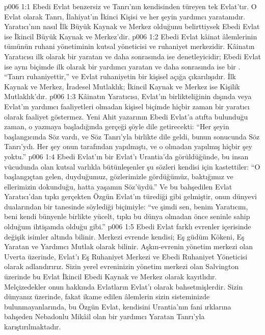 \vs p006 1:1 Ebedi Evlat benzersiz ve Tanrı’nın kendisinden türeyen tek Evlat’tır. O Evlat olarak Tanrı, İlahiyat’ın İkinci Kişisi ve her şeyin yardımcı yaratanıdır. Yaratıcı’nın nasıl İlk Büyük Kaynak ve Merkez olduğunu belirttiysek Ebedi Evlat ise İkincil Büyük Kaynak ve Merkez’dir.
\vs p006 1:2 Ebedi Evlat kâinat âlemlerinin tümünün ruhani yönetiminin kutsal yöneticisi ve ruhaniyet merkezidir. Kâinatın Yaratıcısı ilk olarak bir yaratan ve daha sonrasında ise denetleyicidir; Ebedi Evlat ise aynı biçimde ilk olarak bir yardımcı yaratan ve daha sonrasında ise bir . “Tanrı ruhaniyettir,” ve Evlat ruhaniyetin bir kişisel açığa çıkarılışıdır. İlk Kaynak ve Merkez, İradesel Mutlaklık; İkincil Kaynak ve Merkez ise Kişilik Mutlaklık’dır.
\vs p006 1:3 Kâinatın Yaratıcısı, Evlat’ın birlikteliğinin dışında veya Evlat’ın yardımcı faaliyetleri olmadan kişisel biçimde hiçbir zaman bir yaratıcı olarak faaliyet göstermez. Yeni Ahit yazarının Ebedi Evlat’a atıfta bulunduğu zaman, o yazmaya başladığında gerçeği şöyle dile getirecekti: “Her şeyin başlangıcında Söz vardı, ve Söz Tanrı’yla birlikte dile geldi, bunun sonucunda Söz Tanrı’ydı. Her şey onun tarafından yapılmıştı, ve o olmadan yapılmış hiçbir şey yoktu.”
\vs p006 1:4 Ebedi Evlat’ın bir Evlat’ı Urantia’da görüldüğünde, bu insan vücudunda olan kutsal varlıkla bütünleşenler şu sözleri kendisi için kastettiler: “O başlangıçtan gelen, duyduğumuz, gözlerimizle gördüğümüz, baktığımız ve ellerimizin dokunduğu, hatta yaşamın Söz’üydü.” Ve bu bahşedilen Evlat Yaratıcı’dan tıpkı gerçekten Özgün Evlat’ın türediği gibi gelmiştir, onun dünyevi dualarından bir tanesinde söylediği biçimiyle: “ve şimdi sen, benim Yaratıcım, beni kendi bünyenle birlikte yücelt, tıpkı bu dünya olmadan önce seninle sahip olduğum ihtişamda olduğu gibi.”
\vs p006 1:5 Ebedi Evlat farklı evrenler içerisinde değişik isimler altında bilinir. Merkezi evrende kendisi; Eş güdüm Kökeni, Eş Yaratan ve Yardımcı Mutlak olarak bilinir. Aşkın\hyp{}evrenin yönetim merkezi olan Uverta üzerinde, Evlat’ı Eş Ruhaniyet Merkezi ve Ebedi Ruhaniyet Yöneticisi olarak adlandırırız. Sizin yerel evreninizin yönetim merkezi olan Salvington üzerinde bu Evlat İkincil Ebedi Kaynak ve Merkez olarak kayıtlıdır. Melçizedekler onun hakkında Evlatların Evlat’ı olarak bahsetmişlerdir. Sizin dünyanız üzerinde, fakat ikame edilen âlemlerin sizin sisteminizde bulunmayanlarında, bu Özgün Evlat, kendisini Urantia’nın fani ırklarına bahşeden Nebadonlu Mikâil olan bir yardımcı Yaratan Tanrı’yla karıştırılmaktadır.
